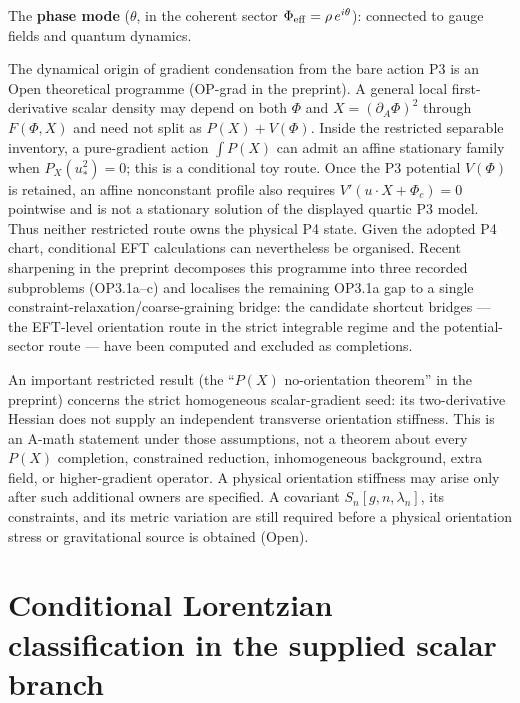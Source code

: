 \documentclass[11pt,a4paper]{article}
\begin{document}
The \textbf{phase mode} ($\theta$, in the coherent sector $\Phi_{\rm eff} = \rho\,e^{i\theta}$): connected to gauge fields and quantum dynamics.

The dynamical origin of gradient condensation from the bare action P3 is an
Open theoretical programme (OP-grad in the preprint).  A general local
first-derivative scalar density may depend on both $\Phi$ and
$X=(\partial_A\Phi)^2$ through $F(\Phi,X)$ and need not split as
$P(X)+V(\Phi)$.  Inside the restricted separable inventory, a pure-gradient
action $\int P(X)$ can admit an affine stationary family when
$P_X(u_*^2)=0$; this is a conditional toy route.  Once the P3 potential
$V(\Phi)$ is retained, an affine nonconstant profile also requires
$V'(u\!\cdot\!X+\Phi_c)=0$ pointwise and is not a stationary solution of the
displayed quartic P3 model.  Thus neither restricted route owns the physical
P4 state.  Given the adopted P4 chart, conditional EFT calculations can
nevertheless be organised.  Recent sharpening in the preprint decomposes
this programme into three recorded subproblems (OP3.1a--c) and localises the
remaining OP3.1a gap to a single constraint-relaxation/coarse-graining bridge:
the candidate shortcut bridges --- the EFT-level orientation route in the
strict integrable regime and the potential-sector route --- have been computed
and excluded as completions.

An important restricted result (the ``$P(X)$ no-orientation theorem'' in the preprint) concerns the strict homogeneous scalar-gradient seed: its two-derivative Hessian does not supply an independent transverse orientation stiffness. This is an A-math statement under those assumptions, not a theorem about every $P(X)$ completion, constrained reduction, inhomogeneous background, extra field, or higher-gradient operator. A physical orientation stiffness may arise only after such additional owners are specified. A covariant $S_n[g,n,\lambda_n]$, its constraints, and its metric variation are still required before a physical orientation stress or gravitational source is obtained (Open).


\section{Conditional Lorentzian classification in the supplied scalar branch}
\label{sec:pop_lorentzian}
\end{document}
